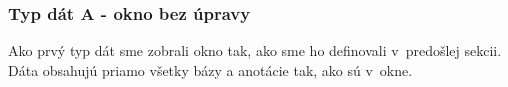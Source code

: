\subsubsection{Typ dát A - okno bez úpravy}

Ako prvý typ dát sme zobrali okno tak, ako sme ho definovali v~predošlej sekcii. Dáta obsahujú priamo všetky bázy a anotácie tak, ako sú v~okne.

